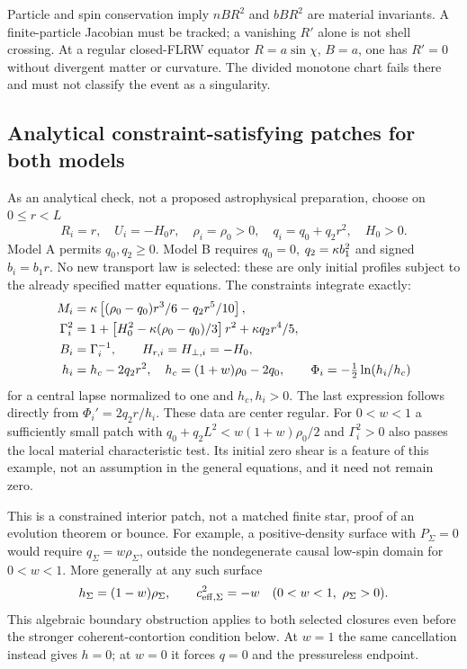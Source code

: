 Particle and spin conservation imply $nBR^2$ and $bBR^2$ are material invariants. A finite-particle Jacobian must be tracked; a vanishing $R'$ alone is not shell crossing. At a regular closed-FLRW equator $R=a\sin\chi$, $B=a$, one has $R'=0$ without divergent matter or curvature. The divided monotone chart fails there and must not classify the event as a singularity.

\subsection{Analytical constraint-satisfying patches for both models}
As an analytical check, not a proposed astrophysical preparation, choose on $0\leq r<L$
\begin{equation}
 R_i=r,\quad U_i=-H_0r,\quad\rho_i=\rho_0>0,\quad q_i=q_0+q_2r^2,\quad H_0>0.
\end{equation}
Model A permits $q_0,q_2\geq0$. Model B requires $q_0=0$, $q_2=\kappa b_1^2$ and signed $b_i=b_1r$. No new transport law is selected: these are only initial profiles subject to the already specified matter equations. The constraints integrate exactly:
\begin{align}
 M_i&=\kappa\left[(\rho_0-q_0)r^3/6-q_2r^5/10\right],\\
 \Gamma_i^2&=1+\left[H_0^2-\kappa(\rho_0-q_0)/3\right]r^2+\kappa q_2r^4/5,\\
 B_i&=\Gamma_i^{-1},\qquad H_{r,i}=H_{\perp,i}=-H_0,\\
 h_i&=h_c-2q_2r^2,\quad h_c=(1+w)\rho_0-2q_0,\qquad
 \Phi_i=-\tfrac12\ln(h_i/h_c)
\end{align}
for a central lapse normalized to one and $h_c,h_i>0$. The last expression follows directly from $\Phi_i'=2q_2r/h_i$. These data are center regular. For $0<w<1$ a sufficiently small patch with $q_0+q_2L^2<w(1+w)\rho_0/2$ and $\Gamma_i^2>0$ also passes the local material characteristic test. Its initial zero shear is a feature of this example, not an assumption in the general equations, and it need not remain zero.

This is a constrained interior patch, not a matched finite star, proof of an evolution theorem or bounce. For example, a positive-density surface with $P_\Sigma=0$ would require $q_\Sigma=w\rho_\Sigma$, outside the nondegenerate causal low-spin domain for $0<w<1$. More generally at any such surface
\begin{equation}
 h_\Sigma=(1-w)\rho_\Sigma,\qquad
 c_{\rm eff,\Sigma}^2=-w\quad(0<w<1,\ \rho_\Sigma>0).
\end{equation}
This algebraic boundary obstruction applies to both selected closures even before the stronger coherent-contortion condition below. At $w=1$ the same cancellation instead gives $h=0$; at $w=0$ it forces $q=0$ and the pressureless endpoint.

